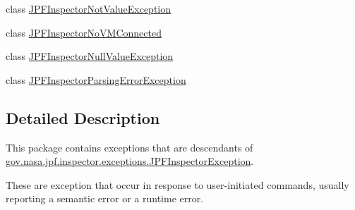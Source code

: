 \begin{DoxyCompactItemize}
class \hyperlink{classgov_1_1nasa_1_1jpf_1_1inspector_1_1exceptions_1_1_j_p_f_inspector_not_value_exception}{J\+P\+F\+Inspector\+Not\+Value\+Exception}
\item 
class \hyperlink{classgov_1_1nasa_1_1jpf_1_1inspector_1_1exceptions_1_1_j_p_f_inspector_no_v_m_connected}{J\+P\+F\+Inspector\+No\+V\+M\+Connected}
\item 
class \hyperlink{classgov_1_1nasa_1_1jpf_1_1inspector_1_1exceptions_1_1_j_p_f_inspector_null_value_exception}{J\+P\+F\+Inspector\+Null\+Value\+Exception}
\item 
class \hyperlink{classgov_1_1nasa_1_1jpf_1_1inspector_1_1exceptions_1_1_j_p_f_inspector_parsing_error_exception}{J\+P\+F\+Inspector\+Parsing\+Error\+Exception}
\end{DoxyCompactItemize}


\subsection{Detailed Description}
This package contains exceptions that are descendants of \hyperlink{classgov_1_1nasa_1_1jpf_1_1inspector_1_1exceptions_1_1_j_p_f_inspector_exception}{gov.\+nasa.\+jpf.\+inspector.\+exceptions.\+J\+P\+F\+Inspector\+Exception}. 

These are exception that occur in response to user-\/initiated commands, usually reporting a semantic error or a runtime error. 